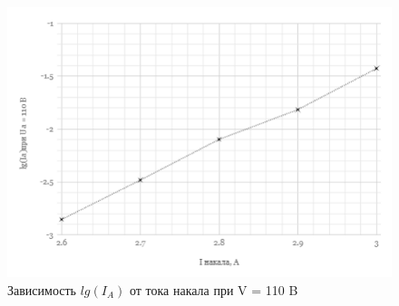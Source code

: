\documentclass[a4paper]{article}
\begin{document}
\begin{figure}[h]
\begin{center}
\includegraphics[width=13cm]{fig4.PNG}
\caption{Зависимость $lg(I_A)$ от тока накала при V = 110 B}
\label{ris:experimoriginal} %
\end{center}
\end{figure}
\end{document}
